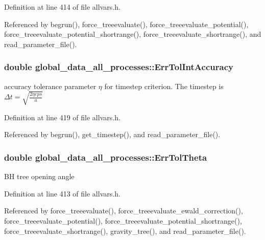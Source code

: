 Definition at line 414 of file allvars.h.



Referenced by begrun(), force\_\-treeevaluate(), force\_\-treeevaluate\_\-potential(), force\_\-treeevaluate\_\-potential\_\-shortrange(), force\_\-treeevaluate\_\-shortrange(), and read\_\-parameter\_\-file().

\hypertarget{structglobal__data__all__processes_a73f3a95e03513c038cf3215a2204bce4}{
\subsubsection[{ErrTolIntAccuracy}]{\setlength{\rightskip}{0pt plus 5cm}double {\bf global\_\-data\_\-all\_\-processes::ErrTolIntAccuracy}}}
\label{structglobal__data__all__processes_a73f3a95e03513c038cf3215a2204bce4}
accuracy tolerance parameter $ \eta $ for timestep criterion. The timestep is $ \Delta t = \sqrt{\frac{2 \eta eps}{a}} $ 

Definition at line 419 of file allvars.h.



Referenced by begrun(), get\_\-timestep(), and read\_\-parameter\_\-file().

\hypertarget{structglobal__data__all__processes_ac3edc89fa5616655618ddccb430e3dfe}{
\subsubsection[{ErrTolTheta}]{\setlength{\rightskip}{0pt plus 5cm}double {\bf global\_\-data\_\-all\_\-processes::ErrTolTheta}}}
\label{structglobal__data__all__processes_ac3edc89fa5616655618ddccb430e3dfe}
BH tree opening angle 

Definition at line 413 of file allvars.h.



Referenced by force\_\-treeevaluate(), force\_\-treeevaluate\_\-ewald\_\-correction(), force\_\-treeevaluate\_\-potential(), force\_\-treeevaluate\_\-potential\_\-shortrange(), force\_\-treeevaluate\_\-shortrange(), gravity\_\-tree(), and read\_\-parameter\_\-file().

